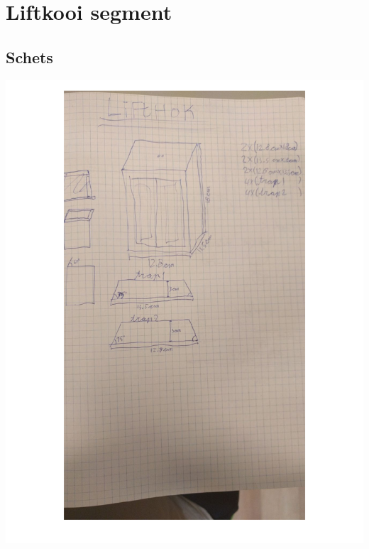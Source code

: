 \section{Liftkooi segment}

\subsection{Schets}
\begin{center}
\includegraphics[height=0.9\textheight, angle = 0]{src/schets/liftkooi.pdf}
\end{center}

